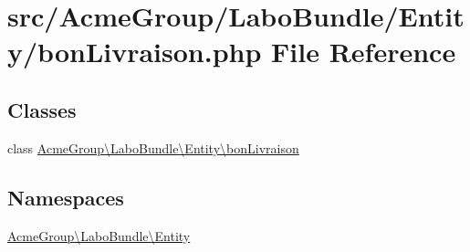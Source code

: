 \hypertarget{bon_livraison_8php}{\section{src/\+Acme\+Group/\+Labo\+Bundle/\+Entity/bon\+Livraison.php File Reference}
\label{bon_livraison_8php}
}
\subsection*{Classes}
\begin{DoxyCompactItemize}
\item 
class \hyperlink{class_acme_group_1_1_labo_bundle_1_1_entity_1_1bon_livraison}{Acme\+Group\textbackslash{}\+Labo\+Bundle\textbackslash{}\+Entity\textbackslash{}bon\+Livraison}
\end{DoxyCompactItemize}
\subsection*{Namespaces}
\begin{DoxyCompactItemize}
\item 
 \hyperlink{namespace_acme_group_1_1_labo_bundle_1_1_entity}{Acme\+Group\textbackslash{}\+Labo\+Bundle\textbackslash{}\+Entity}
\end{DoxyCompactItemize}
